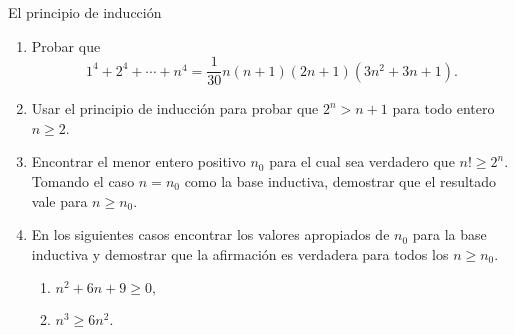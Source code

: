 \begin{section}{El principio de inducción}
\begin{enumerate}
\item Probar que
$$
1^4+2^4+\cdots+n^4= \frac{1}{30}n(n+1)(2n+1)(3n^2+3n+1).
$$
\item Usar el principio de inducción para probar que $2^n>n+1$ para todo entero $n\ge2$.

\item Encontrar el menor entero positivo $n_0$ para el cual sea verdadero que $n! \ge 2^n$. Tomando el caso $n=n_0$ como la base inductiva, demostrar que el resultado vale para $n\ge n_0$.

\item En los siguientes casos encontrar los valores apropiados de $n_0$ para la base inductiva y demostrar que la afirmación es verdadera
para todos los $n\ge n_0$.
\begin{enumerate}
    \item $n^2 +6n + 9 \ge 0,$
    \item $n^3 \ge 6n^2.$
\end{enumerate}

\end{enumerate}
\end{section}

